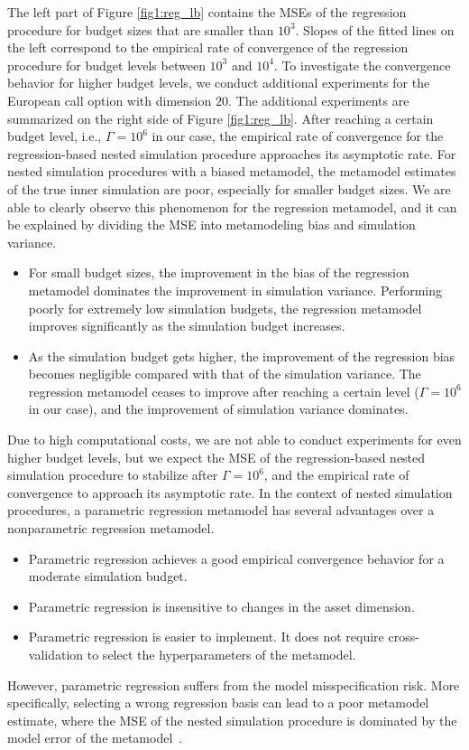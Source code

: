 The left part of Figure \ref{fig1:reg_lb} contains the MSEs of the regression procedure for budget sizes that are smaller than $10^3$. 
Slopes of the fitted lines on the left correspond to the empirical rate of convergence of the regression procedure for budget levels between $10^3$ and $10^4$.
To investigate the convergence behavior for higher budget levels, we conduct additional experiments for the European call option with dimension $20$. 
The additional experiments are summarized on the right side of Figure \ref{fig1:reg_lb}.
After reaching a certain budget level, i.e., $\Gamma = 10^6$ in our case, the empirical rate of convergence for the regression-based nested simulation procedure approaches its asymptotic rate. 
For nested simulation procedures with a biased metamodel, the metamodel estimates of the true inner simulation are poor, especially for smaller budget sizes. 
We are able to clearly observe this phenomenon for the regression metamodel, and it can be explained by dividing the MSE into metamodeling bias and simulation variance.
\begin{itemize}
    \item For small budget sizes, the improvement in the bias of the regression metamodel dominates the improvement in simulation variance. 
    Performing poorly for extremely low simulation budgets, the regression metamodel improves significantly as the simulation budget increases.
    \item As the simulation budget gets higher, the improvement of the regression bias becomes negligible compared with that of the simulation variance. 
    The regression metamodel ceases to improve after reaching a certain level ($\Gamma = 10^6$ in our case), and the improvement of simulation variance dominates.
\end{itemize}
Due to high computational costs, we are not able to conduct experiments for even higher budget levels, but we expect the MSE of the regression-based nested simulation procedure to stabilize after $\Gamma = 10^6$, and the empirical rate of convergence to approach its asymptotic rate.
In the context of nested simulation procedures, a parametric regression metamodel has several advantages over a nonparametric regression metamodel.
\begin{itemize}
    \item Parametric regression achieves a good empirical convergence behavior for a moderate simulation budget.
    \item Parametric regression is insensitive to changes in the asset dimension.
    \item Parametric regression is easier to implement.
    It does not require cross-validation to select the hyperparameters of the metamodel.
\end{itemize}
However, parametric regression suffers from the model misspecification risk.
More specifically, selecting a wrong regression basis can lead to a poor metamodel estimate, where the MSE of the nested simulation procedure is dominated by the model error of the metamodel~\citep{broadie2015risk}.

